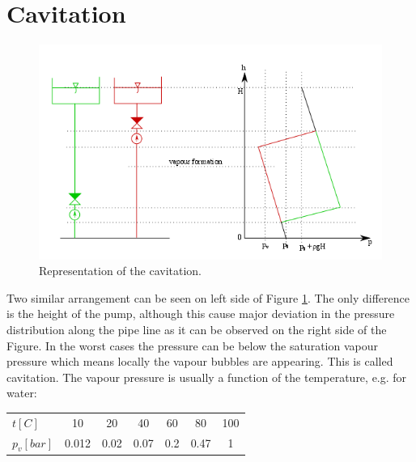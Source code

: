 

\section{Cavitation}

\begin{figure}[!h]
	\begin{center}
	\centering
	\includegraphics[width=13cm]{figs/cavitation.png}
	\caption{\label{fig:cavitation}Representation of the cavitation.}
	\end{center}
\end{figure}

Two similar arrangement can be seen on left side of Figure \ref{fig:cavitation}. The only difference is the height of the pump, although this cause major deviation in the pressure distribution along the pipe line as it can be observed on the right side of the Figure. In the worst cases the pressure can be below the saturation vapour pressure which means locally the vapour bubbles are appearing. This is called cavitation. The vapour pressure is usually a function of the temperature, e.g.  for water:

\begin{center}
	\begin{tabular}{lcccccc}
	$t[C]$ & 10 & 20 & 40 & 60 & 80 & 100 \\
	$p_v [bar]$ & 0.012 & 0.02 & 0.07 & 0.2 & 0.47 & 1\\
	\end{tabular}
\end{center}

